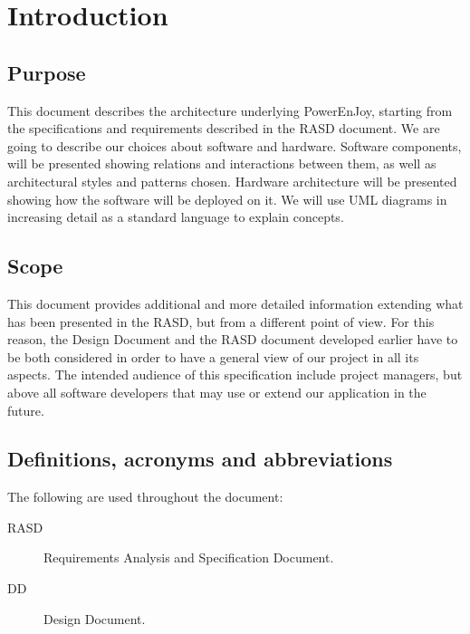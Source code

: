 \section{Introduction}

\subsection{Purpose}
This document describes the architecture underlying PowerEnJoy,
starting from the specifications and requirements described in the RASD document.
We are going to describe our choices about software and hardware.
Software components, will be presented showing relations and interactions between them,
as well as architectural styles and patterns chosen. Hardware architecture will be presented
showing how the software will be deployed on it.
We will use UML diagrams in increasing detail as a standard language to explain concepts.
 
\subsection{Scope}
This document provides additional and more detailed information extending what has been presented in the RASD,
but from a different point of view. For this reason, the Design Document and the RASD 
document developed earlier have to be both considered in order to have a general view of our project 
in all its aspects. 
The intended audience of this specification include project managers, but above all software developers 
that may use or extend our application in the future. 
 
\subsection{Definitions, acronyms and abbreviations}
The following are used throughout the document:
\begin{description}
\item[RASD] Requirements Analysis and Specification Document.
\item[DD] Design Document.
\end{description}
